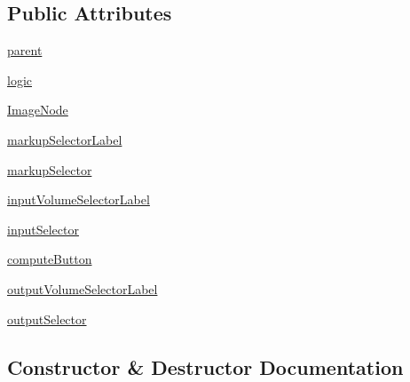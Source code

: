 \subsection*{Public Attributes}
\begin{DoxyCompactItemize}
\item 
\hyperlink{class_bone_segmentation_1_1_bone_segmentation_widget_a0ea50b4a0dff60a3f20d473fa7c5267f}{parent}
\item 
\hyperlink{class_bone_segmentation_1_1_bone_segmentation_widget_a56a110cd069e2b8b28970993cd08a370}{logic}
\item 
\hyperlink{class_bone_segmentation_1_1_bone_segmentation_widget_a6366178a968c7209c01a55f34747c9e0}{Image\+Node}
\item 
\hyperlink{class_bone_segmentation_1_1_bone_segmentation_widget_a2d8eed0881887f1ae1285f8faa855923}{markup\+Selector\+Label}
\item 
\hyperlink{class_bone_segmentation_1_1_bone_segmentation_widget_a6fe4a4a171cf4bf93ed319b694f8f80e}{markup\+Selector}
\item 
\hyperlink{class_bone_segmentation_1_1_bone_segmentation_widget_a087ecc66ea1167394899455299ee3dff}{input\+Volume\+Selector\+Label}
\item 
\hyperlink{class_bone_segmentation_1_1_bone_segmentation_widget_aeef9bc668fa5e4bd4ae83ccae91a52dd}{input\+Selector}
\item 
\hyperlink{class_bone_segmentation_1_1_bone_segmentation_widget_a64c9c6192f80c195649cfd0a575082f9}{compute\+Button}
\item 
\hyperlink{class_bone_segmentation_1_1_bone_segmentation_widget_a753cda86de372958ec7849976a2348f5}{output\+Volume\+Selector\+Label}
\item 
\hyperlink{class_bone_segmentation_1_1_bone_segmentation_widget_abc42def6f122719022ba3a2b1857e5a9}{output\+Selector}
\end{DoxyCompactItemize}


\subsection{Constructor \& Destructor Documentation}
\hypertarget{class_bone_segmentation_1_1_bone_segmentation_widget_a7789bc11657d20776e7a8c1f38110e52}{}
